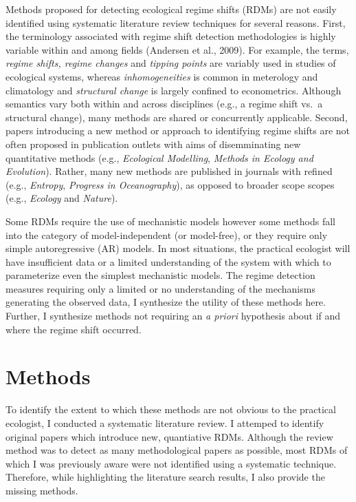 \documentclass[12pt,twoside,openany]{reedthesis}
\begin{document}
Methods proposed for detecting ecological regime shifts (RDMs) are not easily identified using systematic literature review techniques for several reasons. First, the terminology associated with regime shift detection methodologies is highly variable within and among fields (Andersen et al., 2009). For example, the terms, \emph{regime shifts, regime changes} and \emph{tipping points} are variably used in studies of ecological systems, whereas \emph{inhomogeneities} is common in meterology and climatology and \emph{structural change} is largely confined to econometrics. Although semantics vary both within and across disciplines (e.g., a regime shift vs.~a structural change), many methods are shared or concurrently applicable. Second, papers introducing a new method or approach to identifying regime shifts are not often proposed in publication outlets with aims of disemminating new quantitative methods (e.g., \emph{Ecological Modelling}, \emph{Methods in Ecology and Evolution}). Rather, many new methods are published in journals with refined (e.g., \emph{Entropy}, \emph{Progress in Oceanography}), as opposed to broader scope scopes (e.g., \emph{Ecology} and \emph{Nature}).

Some RDMs require the use of mechanistic models however some methods fall into the category of model-independent (or model-free), or they require only simple autoregressive (AR) models. In most situations, the practical ecologist will have insufficient data or a limited understanding of the system with which to parameterize even the simplest mechanistic models. The regime detection measures requiring only a limited or no understanding of the mechanisms generating the observed data, I synthesize the utility of these methods here. Further, I synthesize methods not requiring an \emph{a priori} hypothesis about if and where the regime shift occurred.

\hypertarget{methods}{%
\section{Methods}\label{methods}}

To identify the extent to which these methods are not obvious to the practical ecologist, I conducted a systematic literature review. I attemped to identify original papers which introduce new, quantiative RDMs. Although the review method was to detect as many methodological papers as possible, most RDMs of which I was previously aware were not identified using a systematic technique. Therefore, while highlighting the literature search results, I also provide the missing methods.
\end{document}
